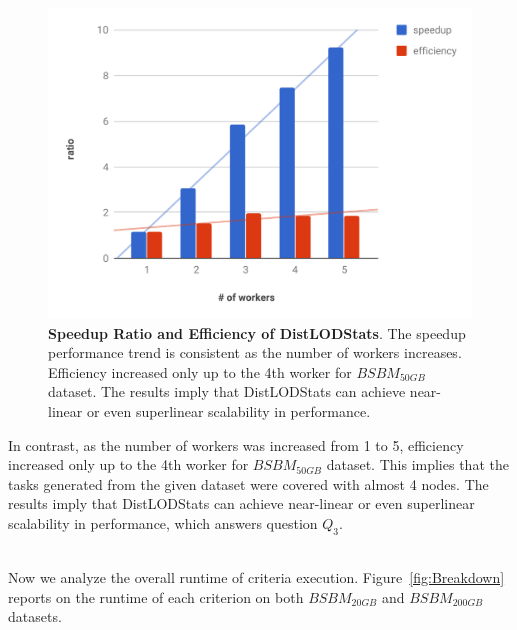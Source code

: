 \begin{figure}
\includegraphics[width=1.0\columnwidth]{images/4_distlodstats/distlodstats-effectiveness.pdf}
\caption{\textbf{Speedup Ratio and Efficiency of DistLODStats}.
The speedup performance trend is consistent as the number of workers increases.
Efficiency increased only up to the 4th worker for $BSBM_{50GB}$ dataset.
The results imply that DistLODStats can achieve near-linear or even superlinear scalability in performance.}
\label{fig:Effectiveness}
\end{figure}

In contrast, as the number of workers was increased from 1 to 5, efficiency increased only up to the 4th worker for $BSBM_{50GB}$ dataset.
This implies that the tasks generated from the given dataset were covered with almost 4 nodes.
The results imply that DistLODStats can achieve near-linear or even superlinear scalability in performance, which answers question $Q_3$.

\hspace*{\fill} \\
Now we analyze the overall runtime of criteria execution.
Figure~\ref{fig:Breakdown} reports on the runtime of each criterion on both $BSBM_{20GB}$ and $BSBM_{200GB}$ datasets.

